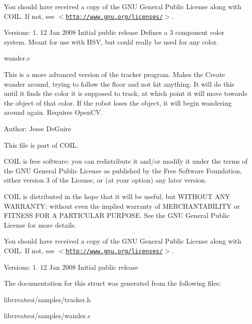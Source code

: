 \-You should have received a copy of the \-G\-N\-U \-General \-Public \-License along with \-C\-O\-I\-L. \-If not, see $<$\href{http://www.gnu.org/licenses/}{\tt http\-://www.\-gnu.\-org/licenses/}$>$.

\-Versions\-: 1. 12 \-Jan 2008 \-Initial public release \-Defines a 3 component color system. \-Meant for use with \-H\-S\-V, but could really be used for any color.

wander.\-c

\-This is a more advanced version of the tracker program. \-Makes the \-Create wander around, trying to follow the floor and not hit anything. \-It will do this until it finds the color it is supposed to track, at which point it will move towards the object of that color. \-If the robot loses the object, it will begin wandering around again. \-Requires \-Open\-C\-V.

\-Author\-: \-Jesse \-De\-Guire

\-This file is part of \-C\-O\-I\-L.

\-C\-O\-I\-L is free software\-: you can redistribute it and/or modify it under the terms of the \-G\-N\-U \-General \-Public \-License as published by the \-Free \-Software \-Foundation, either version 3 of the \-License, or (at your option) any later version.

\-C\-O\-I\-L is distributed in the hope that it will be useful, but \-W\-I\-T\-H\-O\-U\-T \-A\-N\-Y \-W\-A\-R\-R\-A\-N\-T\-Y; without even the implied warranty of \-M\-E\-R\-C\-H\-A\-N\-T\-A\-B\-I\-L\-I\-T\-Y or \-F\-I\-T\-N\-E\-S\-S \-F\-O\-R \-A \-P\-A\-R\-T\-I\-C\-U\-L\-A\-R \-P\-U\-R\-P\-O\-S\-E. \-See the \-G\-N\-U \-General \-Public \-License for more details.

\-You should have received a copy of the \-G\-N\-U \-General \-Public \-License along with \-C\-O\-I\-L. \-If not, see $<$\href{http://www.gnu.org/licenses/}{\tt http\-://www.\-gnu.\-org/licenses/}$>$.

\-Versions\-: 1. 12 \-Jan 2008 \-Initial public release 

\-The documentation for this struct was generated from the following files\-:\begin{DoxyCompactItemize}
\item 
libcreateoi/samples/tracker.\-h\item 
libcreateoi/samples/wander.\-c\end{DoxyCompactItemize}
